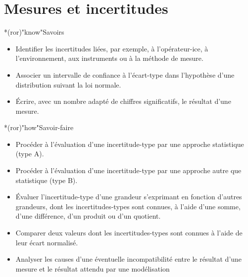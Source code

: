 \documentclass[../main/main.tex]{subfiles}
\begin{document}
\setcounter{chapter}{-1}

\chapter{Mesures et incertitudes}

\vfill

\begin{prgm}
	\begin{tcb}*(ror)"know"{Savoirs}
		\begin{itemize}[label=$\diamond$, leftmargin=10pt]
			\item Identifier les incertitudes liées, par exemple, à l'opérateur-ice, à
			      l'environnement, aux instruments ou à la méthode de mesure.
			\item Associer un intervalle de confiance à l'écart-type dans l'hypothèse
			      d'une distribution suivant la loi normale.
			\item Écrire, avec un nombre adapté de chiffres significatifs, le résultat
			      d’une mesure.
		\end{itemize}
	\end{tcb}

	\begin{tcb}*(ror)"how"{Savoir-faire}
		\begin{itemize}[label=$\diamond$, leftmargin=10pt]
			\item Procéder à l'évaluation d'une incertitude-type par une approche
			      statistique (type A).
			\item Procéder à l'évaluation d'une incertitude-type par une approche
			      autre que statistique (type B).
			\item Évaluer l'incertitude-type d'une grandeur s'exprimant en fonction
			      d'autres grandeurs, dont les incertitudes-types sont connues, à
			      l'aide d'une somme, d'une différence, d'un produit ou d'un quotient.
			\item Comparer deux valeurs dont les incertitudes-types sont connues à
			      l'aide de leur écart normalisé.
			\item Analyser les causes d’une éventuelle incompatibilité entre le
			      résultat d’une mesure et le résultat attendu par une modélisation
		\end{itemize}
	\end{tcb}
\end{prgm}
\end{document}
